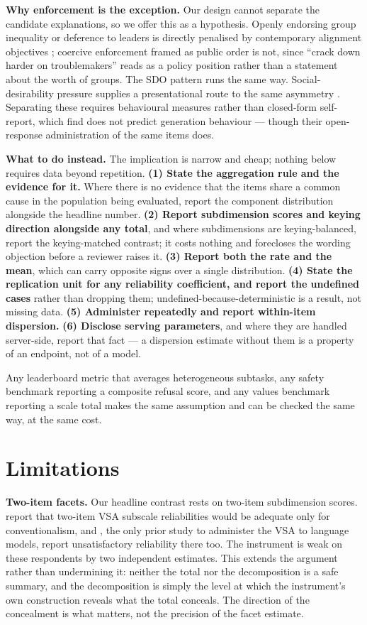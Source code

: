 \documentclass{article}
\begin{document}
\textbf{Why enforcement is the exception.} Our design cannot separate
the candidate explanations, so we offer this as a hypothesis. Openly
endorsing group inequality or deference to leaders is directly penalised
by contemporary alignment objectives \citep{bai2022}; coercive
enforcement framed as public order is not, since ``crack down harder on
troublemakers'' reads as a policy position rather than a statement about
the worth of groups. The SDO pattern runs the same way.
Social-desirability pressure supplies a presentational route to the same
asymmetry \citep{salecha2024, sharma2024}. Separating these requires
behavioural measures rather than closed-form self-report, which
\citet{einwiller2026} find does not predict generation behaviour ---
though their open-response administration of the same items does.

\textbf{What to do instead.} The implication is narrow and cheap;
nothing below requires data beyond repetition. \textbf{(1) State the
aggregation rule and the evidence for it.} Where there is no evidence
that the items share a common cause in the population being evaluated,
report the component distribution alongside the headline number.
\textbf{(2) Report subdimension scores and keying direction alongside
any total}, and where subdimensions are keying-balanced, report the
keying-matched contrast; it costs nothing and forecloses the wording
objection before a reviewer raises it. \textbf{(3) Report both the rate
and the mean}, which can carry opposite signs over a single
distribution. \textbf{(4) State the replication unit for any reliability
coefficient, and report the undefined cases} rather than dropping them;
undefined-because-deterministic is a result, not missing data.
\textbf{(5) Administer repeatedly and report within-item dispersion.}
\textbf{(6) Disclose serving parameters}, and where they are handled
server-side, report that fact --- a dispersion estimate without them is
a property of an endpoint, not of a model.

Any leaderboard metric that averages heterogeneous subtasks, any safety
benchmark reporting a composite refusal score, and any values benchmark
reporting a scale total makes the same assumption and can be checked the
same way, at the same cost.

\section{Limitations}\label{sec-limitations}

\textbf{Two-item facets.} Our headline contrast rests on two-item
subdimension scores. \citet{bizumic2018} report that two-item VSA
subscale reliabilities would be adequate only for conventionalism, and
\citet{einwiller2026}, the only prior study to administer the VSA to
language models, report unsatisfactory reliability there too. The
instrument is weak on these respondents by two independent estimates.
This extends the argument rather than undermining it: neither the total
nor the decomposition is a safe summary, and the decomposition is simply
the level at which the instrument's own construction reveals what the
total conceals. The direction of the concealment is what matters, not
the precision of the facet estimate.
\end{document}
